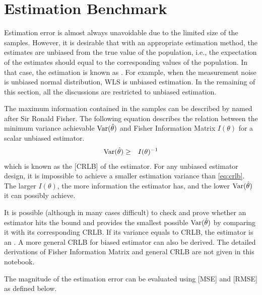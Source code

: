 \section{Estimation Benchmark}

Estimation error is almost always unavoidable due to the limited size of the samples. However, it is desirable that with an appropriate estimation method, the estimates are unbiased from the true value of the population, i.e., the expectation of the estimates should equal to the corresponding values of the population. In that case, the estimation is known as . For example, when the measurement noise is unbiased normal distribution, WLS is unbiased estimation. In the remaining of this section, all the discussions are restricted to unbiased estimation.

The maximum information contained in the samples can be described by  named after Sir Ronald Fisher. The following equation describes the relation between the minimum variance achievable $\textup{Var}(\hat{\theta})$ and Fisher Information Matrix $I(\theta)$ for a scalar unbiased estimator.
\begin{eqnarray}
	\textup{Var}(\hat{\theta}) &\geq& I(\theta)^{-1} \label{eq:crlb}
\end{eqnarray}
which is known as the [CRLB] of the estimator. For any unbiased estimator design, it is impossible to achieve a smaller estimation variance than \eqref{eq:crlb}. The larger $I(\theta)$, the more information the estimator has, and the lower $\textup{Var}(\hat{\theta})$ it can possibly achieve.

It is possible (although in many cases difficult) to check and prove whether an estimator hits the bound and provides the smallest possible $\textup{Var}(\hat{\theta})$ by comparing it with its corresponding CRLB. If its variance equals to CRLB, the estimator is an . A more general CRLB for biased estimator can also be derived. The detailed derivations of Fisher Information Matrix and general CRLB are not given in this notebook.

The magnitude of the estimation error can be evaluated using [MSE] and [RMSE] as defined below. 

